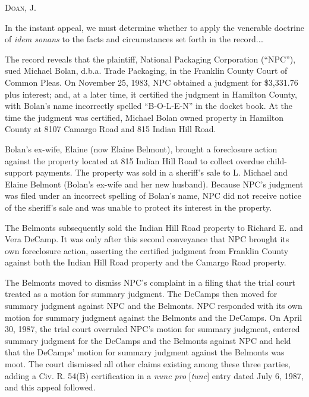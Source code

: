 
\opinion \textsc{Doan}, J.

In the instant appeal, we must determine whether to apply the venerable doctrine
of \textit{idem sonans} to the facts and circumstances set forth in the
record.\ldots

The record reveals that the plaintiff, National Packaging Corporation (``NPC''),
sued Michael Bolan, d.b.a. Trade Packaging, in the Franklin County Court of
Common Pleas. On November 25, 1983, NPC obtained a judgment for \$3,331.76 plus
interest; and, at a later time, it certified the judgment in Hamilton County,
with Bolan's name incorrectly spelled ``B-O-L-E-N'' in the docket book. At the
time the judgment was certified, Michael Bolan owned property in Hamilton
County at 8107 Camargo Road and 815 Indian Hill Road.

Bolan's ex-wife, Elaine (now Elaine Belmont), brought a foreclosure action
against the property located at 815 Indian Hill Road to collect overdue
child-support payments. The property was sold in a sheriff's sale to L. Michael
and Elaine Belmont (Bolan's ex-wife and her new husband). Because NPC's
judgment was filed under an incorrect spelling of Bolan's name, NPC did not
receive notice of the sheriff's sale and was unable to protect its interest in
the property.

The Belmonts subsequently sold the Indian Hill Road property to Richard E. and
Vera DeCamp. It was only after this second conveyance that NPC brought its own
foreclosure action, asserting the certified judgment from Franklin County
against both the Indian Hill Road property and the Camargo Road property.

The Belmonts moved to dismiss NPC's complaint in a filing that the trial court
treated as a motion for summary judgment. The DeCamps then moved for summary
judgment against NPC and the Belmonts. NPC responded with its own motion for
summary judgment against the Belmonts and the DeCamps. On April 30, 1987, the
trial court overruled NPC's motion for summary judgment, entered summary
judgment for the DeCamps and the Belmonts against NPC and held that the
DeCamps' motion for summary judgment against the Belmonts was moot. The court
dismissed all other claims existing among these three parties, adding a Civ. R.
54(B) certification in a \textit{nunc pro }[\textit{tunc}] entry dated July 6,
1987, and this appeal followed.

